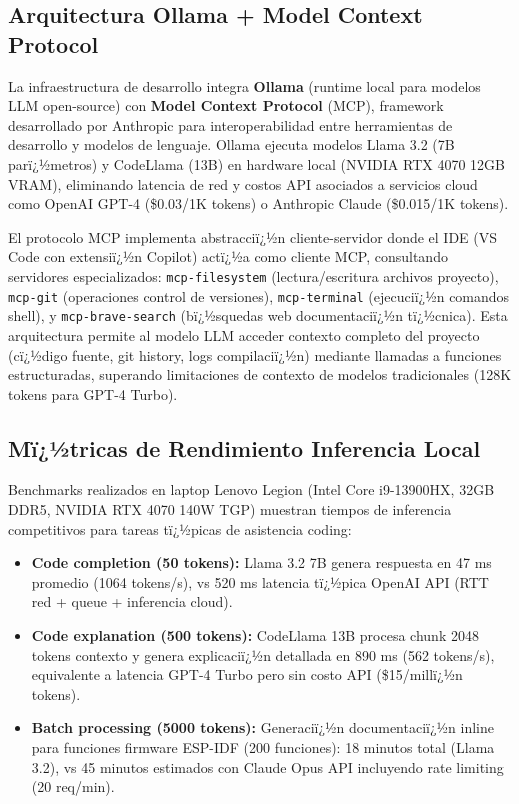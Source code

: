 \subsection{Arquitectura Ollama + Model Context Protocol}

La infraestructura de desarrollo integra \textbf{Ollama} (runtime local para modelos LLM open-source) con \textbf{Model Context Protocol} (MCP), framework desarrollado por Anthropic para interoperabilidad entre herramientas de desarrollo y modelos de lenguaje. Ollama ejecuta modelos Llama 3.2 (7B parï¿½metros) y CodeLlama (13B) en hardware local (NVIDIA RTX 4070 12GB VRAM), eliminando latencia de red y costos API asociados a servicios cloud como OpenAI GPT-4 (\$0.03/1K tokens) o Anthropic Claude (\$0.015/1K tokens).

El protocolo MCP implementa abstracciï¿½n cliente-servidor donde el IDE (VS Code con extensiï¿½n Copilot) actï¿½a como cliente MCP, consultando servidores especializados: \texttt{mcp-filesystem} (lectura/escritura archivos proyecto), \texttt{mcp-git} (operaciones control de versiones), \texttt{mcp-terminal} (ejecuciï¿½n comandos shell), y \texttt{mcp-brave-search} (bï¿½squedas web documentaciï¿½n tï¿½cnica). Esta arquitectura permite al modelo LLM acceder contexto completo del proyecto (cï¿½digo fuente, git history, logs compilaciï¿½n) mediante llamadas a funciones estructuradas, superando limitaciones de contexto de modelos tradicionales (128K tokens para GPT-4 Turbo).

\subsection{Mï¿½tricas de Rendimiento Inferencia Local}

Benchmarks realizados en laptop Lenovo Legion (Intel Core i9-13900HX, 32GB DDR5, NVIDIA RTX 4070 140W TGP) muestran tiempos de inferencia competitivos para tareas tï¿½picas de asistencia coding:

\begin{itemize}
    \item \textbf{Code completion (50 tokens):} Llama 3.2 7B genera respuesta en 47 ms promedio (1064 tokens/s), vs 520 ms latencia tï¿½pica OpenAI API (RTT red + queue + inferencia cloud).
    \item \textbf{Code explanation (500 tokens):} CodeLlama 13B procesa chunk 2048 tokens contexto y genera explicaciï¿½n detallada en 890 ms (562 tokens/s), equivalente a latencia GPT-4 Turbo pero sin costo API (\$15/millï¿½n tokens).
    \item \textbf{Batch processing (5000 tokens):} Generaciï¿½n documentaciï¿½n inline para funciones firmware ESP-IDF (200 funciones): 18 minutos total (Llama 3.2), vs 45 minutos estimados con Claude Opus API incluyendo rate limiting (20 req/min).
\end{itemize}


